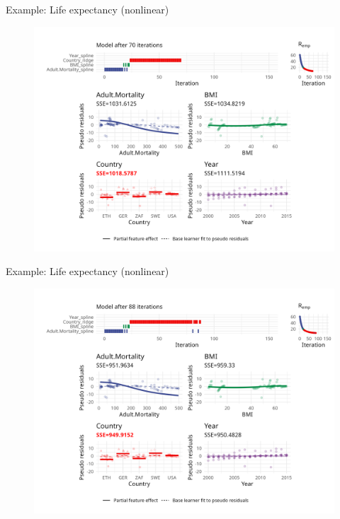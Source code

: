 \begin{frame}{Example: Life expectancy (nonlinear)}
	\begin{figure}
		\centering
		\includegraphics[width=\textwidth]{figure/cwb-anim-nl/fig-iter-0070.png}
	\end{figure}
	\addtocounter{framenumber}{-1}
\end{frame}


\begin{frame}{Example: Life expectancy (nonlinear)}
	\begin{figure}
		\centering
		\includegraphics[width=\textwidth]{figure/cwb-anim-nl/fig-iter-0088.png}
	\end{figure}
	\addtocounter{framenumber}{-1}
\end{frame}


